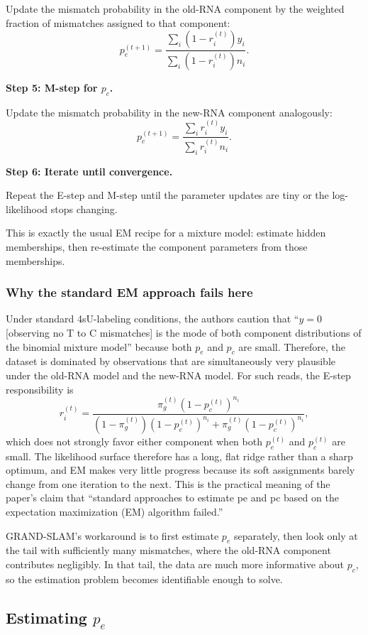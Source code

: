 \documentclass[11pt]{article}
\begin{document}
Update the mismatch probability in the old-RNA component by the weighted fraction of mismatches assigned to that component:
\[
p_e^{(t+1)}
=
\frac{\sum_i (1-r_i^{(t)})y_i}
{\sum_i (1-r_i^{(t)})n_i}.
\]

\textbf{Step 5: M-step for $p_c$.}

Update the mismatch probability in the new-RNA component analogously:
\[
p_c^{(t+1)}
=
\frac{\sum_i r_i^{(t)}y_i}
{\sum_i r_i^{(t)}n_i}. 
\]

\textbf{Step 6: Iterate until convergence.}

Repeat the E-step and M-step until the parameter updates are tiny or the log-likelihood stops changing.

This is exactly the usual EM recipe for a mixture model: estimate hidden memberships, then re-estimate the component parameters from those memberships.

\subsubsection{Why the standard EM approach fails here}

Under standard 4sU-labeling conditions, the authors caution that ``$y = 0$ [observing no T to C mismatches] is the mode of both component distributions of the binomial mixture model'' because both $p_e$ and $p_c$ are small. Therefore, the dataset is dominated by observations that are simultaneously very plausible under the old-RNA model and the new-RNA model. For such reads, the E-step responsibility is
\[
r_i^{(t)}
=
\frac{\pi_g^{(t)}(1-p_c^{(t)})^{n_i}}
{(1-\pi_g^{(t)})(1-p_e^{(t)})^{n_i}+\pi_g^{(t)}(1-p_c^{(t)})^{n_i}},
\]
which does not strongly favor either component when both $p_e^{(t)}$ and $p_c^{(t)}$ are small. The likelihood surface therefore has a long, flat ridge rather than a sharp optimum, and EM makes very little progress because its soft assignments barely change from one iteration to the next. This is the practical meaning of the paper's claim that ``standard approaches to estimate pe and pc based on the expectation maximization (EM) algorithm failed.''

GRAND-SLAM's workaround is to first estimate $p_e$ separately, then look only at the tail with sufficiently many mismatches, where the old-RNA component contributes negligibly. In that tail, the data are much more informative about $p_c$, so the estimation problem becomes identifiable enough to solve.

\subsection{\texorpdfstring{Estimating $p_e$}{Estimating pe}}
\end{document}
